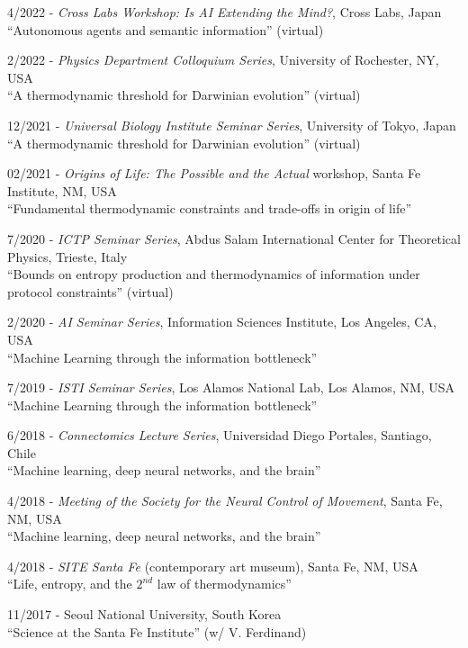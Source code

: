 \documentclass[margin,line,centered]{res}
\begin{document}
\begin{resume}
4/2022 - \emph{Cross Labs Workshop: Is AI Extending the Mind?}, Cross Labs, Japan\\
``Autonomous agents and semantic information'' (virtual) %

2/2022 - \emph{Physics Department Colloquium Series}, University of Rochester, NY, USA\\
``A thermodynamic threshold for Darwinian evolution'' (virtual) %

12/2021 - \emph{Universal Biology Institute Seminar Series}, University of Tokyo, Japan\\
``A thermodynamic threshold for Darwinian evolution'' (virtual) %

02/2021 - \emph{Origins of Life: The Possible and the Actual} workshop, Santa Fe Institute, NM, USA\\
``Fundamental thermodynamic constraints and trade-offs in origin of life'' %

7/2020 - \emph{ICTP Seminar Series}, Abdus Salam International Center for Theoretical Physics, Trieste, Italy\\
``Bounds on entropy production and thermodynamics of information under protocol constraints'' (virtual) %

2/2020 - \emph{AI Seminar Series}, Information Sciences Institute, Los Angeles, CA, USA\\
``Machine Learning through the information bottleneck'' %

7/2019 - \emph{ISTI Seminar Series}, Los Alamos National Lab, Los Alamos, NM, USA\\
``Machine Learning through the information bottleneck''  %

6/2018 - \emph{Connectomics Lecture Series}, Universidad Diego Portales, Santiago, Chile\\
``Machine learning, deep neural networks, and the brain''  %

4/2018 - \emph{Meeting of the Society for the Neural Control of Movement}, Santa Fe, NM, USA\\
``Machine learning, deep neural networks, and the brain''

4/2018 - \emph{SITE Santa Fe} (contemporary art museum), Santa Fe, NM, USA\\
``Life, entropy, and the $2^{{nd}}$ law of thermodynamics''

11/2017 - Seoul National University, South Korea\\
``Science at the Santa Fe Institute'' (w/ V. Ferdinand) %


\end{resume}
\end{document}
